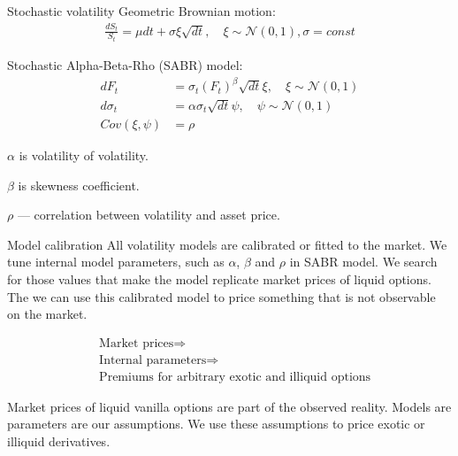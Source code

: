 \documentclass{beamer}
\begin{document}
\begin{frame}{Stochastic volatility}
\justify
Geometric Brownian motion:
\begin{align*}
\frac{dS_t}{S_t} = \mu dt + \sigma\xi\sqrt{dt}, \quad \xi \sim \mathcal{N}(0, 1), \sigma = const
\end{align*}

\justify
Stochastic Alpha-Beta-Rho (SABR) model:
\begin{align*}
dF_t &= \sigma_t(F_t)^\beta \sqrt{dt}\xi, \quad \xi \sim \mathcal{N}(0, 1) \\
d\sigma_t &= \alpha\sigma_t\sqrt{dt}\psi, \quad \psi \sim \mathcal{N}(0, 1) \\
Cov(\xi, \psi) &= \rho
\end{align*}

\justify
$\alpha$ is volatility of volatility.

$\beta$ is skewness coefficient.

$\rho$ --- correlation between volatility and asset price.
\end{frame}



\begin{frame}{Model calibration}
\justify
All volatility models are calibrated or fitted to the market. We tune internal model parameters, such as $\alpha$, $\beta$ and $\rho$ in SABR model. We search for those values that make the model replicate market prices of liquid options. The we can use this calibrated model to price something that is not observable on the market.

\begin{align*}
&\text{Market prices} \Rightarrow \\
&\text{Internal parameters} \Rightarrow \\
&\text{Premiums for arbitrary exotic and illiquid options}
\end{align*}

\justify
Market prices of liquid vanilla options are part of the observed reality. Models are parameters are our assumptions. We use these assumptions to price exotic or illiquid derivatives.
\end{frame}
\end{document}
